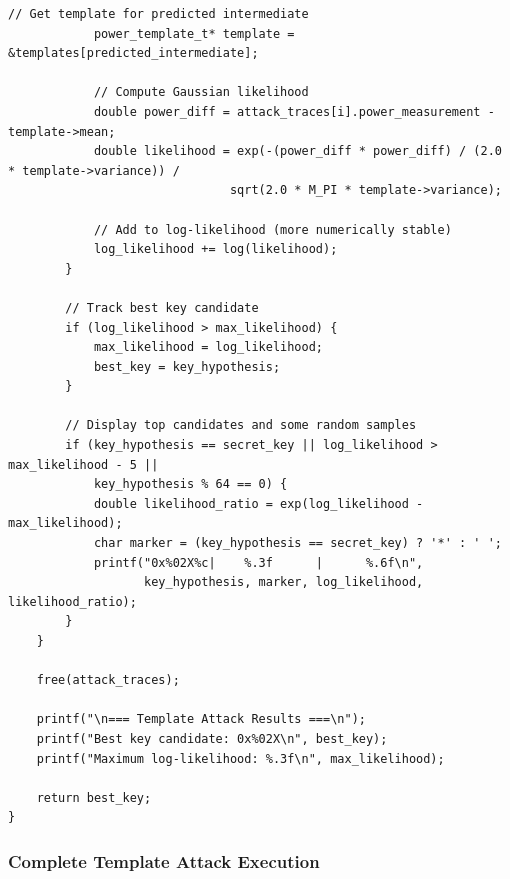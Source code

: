 \documentclass[11pt,a4paper]{article}
\theoremstyle{definition}
\begin{document}
\begin{lstlisting}[caption={Template Attack Key Recovery Implementation}]
            // Get template for predicted intermediate
            power_template_t* template = &templates[predicted_intermediate];
            
            // Compute Gaussian likelihood
            double power_diff = attack_traces[i].power_measurement - template->mean;
            double likelihood = exp(-(power_diff * power_diff) / (2.0 * template->variance)) / 
                               sqrt(2.0 * M_PI * template->variance);
            
            // Add to log-likelihood (more numerically stable)
            log_likelihood += log(likelihood);
        }
        
        // Track best key candidate
        if (log_likelihood > max_likelihood) {
            max_likelihood = log_likelihood;
            best_key = key_hypothesis;
        }
        
        // Display top candidates and some random samples
        if (key_hypothesis == secret_key || log_likelihood > max_likelihood - 5 || 
            key_hypothesis % 64 == 0) {
            double likelihood_ratio = exp(log_likelihood - max_likelihood);
            char marker = (key_hypothesis == secret_key) ? '*' : ' ';
            printf("0x%02X%c|    %.3f      |      %.6f\n", 
                   key_hypothesis, marker, log_likelihood, likelihood_ratio);
        }
    }
    
    free(attack_traces);
    
    printf("\n=== Template Attack Results ===\n");
    printf("Best key candidate: 0x%02X\n", best_key);
    printf("Maximum log-likelihood: %.3f\n", max_likelihood);
    
    return best_key;
}
\end{lstlisting}

\subsubsection{Complete Template Attack Execution}
\end{document}
